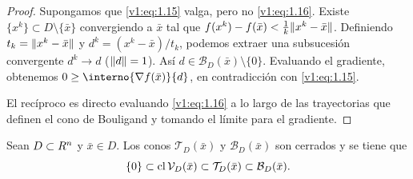 \begin{proof}
 Supongamos que \eqref{v1:eq:1.15} valga, pero no \eqref{v1:eq:1.16}. Existe $\{x^k\} \subset D \setminus \{\bar{x}\}$ convergiendo a $\bar{x}$ tal que $f(x^k) - f(\bar{x}) < \frac{1}{k} \lVert x^k - \bar{x}\rVert$. Definiendo $t_k = \lVert x^k - \bar{x}\rVert$ y $d^k = (x^k - \bar{x})/t_k$, podemos extraer una subsucesión convergente $d^k \to d$ ($\lVert d\rVert=1$). Así $d \in \mathcal{B}_D(\bar{x}) \setminus \{0\}$. Evaluando el gradiente, obtenemos $0 \ge \interno{\nabla f(\bar{x})}{d}$, en contradicción con \eqref{v1:eq:1.15}.
 
 El recíproco es directo evaluando \eqref{v1:eq:1.16} a lo largo de las trayectorias que definen el cono de Bouligand y tomando el límite para el gradiente.
\end{proof}

\begin{proposition}\label{v1:prop:1.4.1}
 Sean $D \subset R^n$ y $\bar{x} \in D$. Los conos $\mathcal{T}_D(\bar{x})$ y $\mathcal{B}_D(\bar{x})$ son cerrados y se tiene que
 \[
 \{0\} \subset \operatorname{cl} \mathcal{V}_D(\bar{x}) \subset \mathcal{T}_D(\bar{x}) \subset \mathcal{B}_D(\bar{x}).
 \]
\end{proposition}